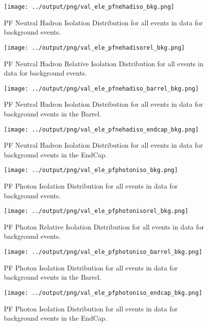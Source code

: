 \documentclass[11pt]{book}
\begin{document}
\begin{figure}[htb]
\centering
\texttt{[image: ../output/png/val\_ele\_pfnehadiso\_bkg.png]}
\caption{PF Neutral Hadron Isolation Distribution for all events in data for background events.}
\label{fig:val_ele_pfnehadiso_bkg}
\end{figure}

\begin{figure}[htb]
\centering
\texttt{[image: ../output/png/val\_ele\_pfnehadisorel\_bkg.png]}
\caption{PF Neutral Hadron Relative Isolation Distribution for all events in data for background events.}
\label{fig:val_ele_pfnehadisorel_bkg}
\end{figure}

\begin{figure}[htb]
\centering
\texttt{[image: ../output/png/val\_ele\_pfnehadiso\_barrel\_bkg.png]}
\caption{PF Neutral Hadron Isolation Distribution for all events in data for background events in the Barrel.}
\label{fig:val_ele_pfnehadiso_barrel_bkg}
\end{figure}

\begin{figure}[htb]
\centering
\texttt{[image: ../output/png/val\_ele\_pfnehadiso\_endcap\_bkg.png]}
\caption{PF Neutral Hadron Isolation Distribution for all events in data for background events in the EndCap.}
\label{fig:val_ele_pfnehadiso_endcap_bkg}
\end{figure}

\begin{figure}[htb]
\centering
\texttt{[image: ../output/png/val\_ele\_pfphotoniso\_bkg.png]}
\caption{PF Photon Isolation Distribution for all events in data for background events.}
\label{fig:val_ele_pfphotoniso_bkg}
\end{figure}

\begin{figure}[htb]
\centering
\texttt{[image: ../output/png/val\_ele\_pfphotonisorel\_bkg.png]}
\caption{PF Photon Relative Isolation Distribution for all events in data for background events.}
\label{fig:val_ele_pfphotonisorel_bkg}
\end{figure}

\begin{figure}[htb]
\centering
\texttt{[image: ../output/png/val\_ele\_pfphotoniso\_barrel\_bkg.png]}
\caption{PF Photon Isolation Distribution for all events in data for background events in the Barrel.}
\label{fig:val_ele_pfphotoniso_barrel_bkg}
\end{figure}

\begin{figure}[htb]
\centering
\texttt{[image: ../output/png/val\_ele\_pfphotoniso\_endcap\_bkg.png]}
\caption{PF Photon Isolation Distribution for all events in data for background events in the EndCap.}
\label{fig:val_ele_pfphotoniso_endcap_bkg}
\end{figure}
\end{document}
